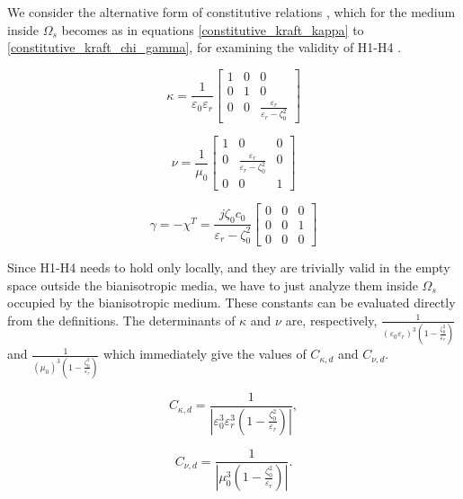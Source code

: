 We consider the alternative form of constitutive relations , 
which for the medium inside $\Omega_s$ becomes as
in equations \eqref{constitutive_kraft_kappa} to \eqref{constitutive_kraft_chi_gamma}, 
for examining the validity of H1-H4 \cite{noiregolarita}.

\begin{equation} \label{constitutive_kraft_kappa}
\kappa = \frac{1}{\varepsilon_0\varepsilon_r}
\begin{bmatrix}
1 & 0 & 0 \\
0 & 1 & 0 \\
0 & 0 & \frac{\varepsilon_r}{\varepsilon_r-\zeta_0^2}
\end{bmatrix}
\end{equation}

\begin{equation} \label{constitutive_kraft_nu}
\nu = \frac{1}{\mu_0}
\begin{bmatrix}
1 & 0 & 0 \\
0 & \frac{\varepsilon_r}{\varepsilon_r - \zeta_0^2} & 0 \\
0 & 0 & 1
\end{bmatrix}
\end{equation}

\begin{equation} \label{constitutive_kraft_chi_gamma}
\gamma = -\chi^T = \frac{j\zeta_0c_0}{\varepsilon_r-\zeta_0^2}
\begin{bmatrix}
0 & 0 & 0 \\
0 & 0 & 1 \\
0 & 0 & 0
\end{bmatrix}
\end{equation}

Since H1-H4 needs to hold only locally, and they are trivially 
valid in the empty space outside the bianisotropic media, 
we have to just analyze them inside $\Omega_s$ occupied by the bianisotropic medium.
These constants can be evaluated directly from the definitions. 
The determinants of $\kappa$ and $\nu$ are, respectively, 
$\frac{1}{(\varepsilon_0 \varepsilon_r)^3(1-\frac{\zeta_0^2}{\varepsilon_r})}$ and
$\frac{1}{(\mu_0)^3(1-\frac{\zeta_0^2}{\varepsilon_r})}$  which immediately give the values of  $C_{\kappa,d}$ and $C_{\nu,d}$.

\begin{equation}
C_{\kappa,d} =  \frac{1}{|\varepsilon_0^3\varepsilon_r^3(1 - \frac{\zeta_0^2}{\varepsilon_r})|}, 
\end{equation}

\begin{equation}
C_{\nu,d} =  \frac{1}{|\mu_0^3(1 - \frac{\zeta_0^2}{\varepsilon_r})|}.
\end{equation}

